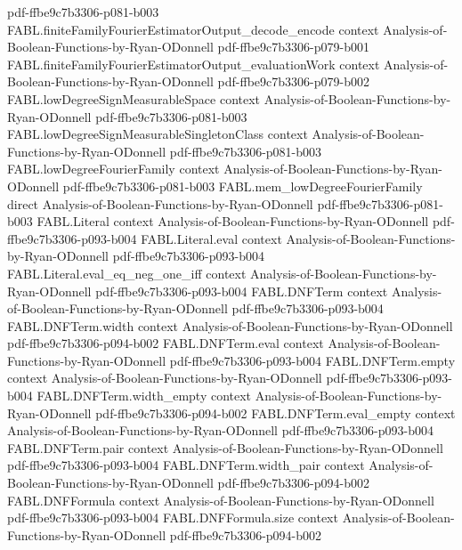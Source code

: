 \begin{theorem}
  {pdf-ffbe9c7b3306-p081-b003}
\proofstep
  {FABL.finiteFamilyFourierEstimatorOutput_decode_encode}
  {context}
  {Analysis-of-Boolean-Functions-by-Ryan-ODonnell}
  {pdf-ffbe9c7b3306-p079-b001}
\proofstep
  {FABL.finiteFamilyFourierEstimatorOutput_evaluationWork}
  {context}
  {Analysis-of-Boolean-Functions-by-Ryan-ODonnell}
  {pdf-ffbe9c7b3306-p079-b002}
\proofstep
  {FABL.lowDegreeSignMeasurableSpace}
  {context}
  {Analysis-of-Boolean-Functions-by-Ryan-ODonnell}
  {pdf-ffbe9c7b3306-p081-b003}
\proofstep
  {FABL.lowDegreeSignMeasurableSingletonClass}
  {context}
  {Analysis-of-Boolean-Functions-by-Ryan-ODonnell}
  {pdf-ffbe9c7b3306-p081-b003}
\proofstep
  {FABL.lowDegreeFourierFamily}
  {context}
  {Analysis-of-Boolean-Functions-by-Ryan-ODonnell}
  {pdf-ffbe9c7b3306-p081-b003}
\proofstep
  {FABL.mem_lowDegreeFourierFamily}
  {direct}
  {Analysis-of-Boolean-Functions-by-Ryan-ODonnell}
  {pdf-ffbe9c7b3306-p081-b003}
\proofstep
  {FABL.Literal}
  {context}
  {Analysis-of-Boolean-Functions-by-Ryan-ODonnell}
  {pdf-ffbe9c7b3306-p093-b004}
\proofstep
  {FABL.Literal.eval}
  {context}
  {Analysis-of-Boolean-Functions-by-Ryan-ODonnell}
  {pdf-ffbe9c7b3306-p093-b004}
\proofstep
  {FABL.Literal.eval_eq_neg_one_iff}
  {context}
  {Analysis-of-Boolean-Functions-by-Ryan-ODonnell}
  {pdf-ffbe9c7b3306-p093-b004}
\proofstep
  {FABL.DNFTerm}
  {context}
  {Analysis-of-Boolean-Functions-by-Ryan-ODonnell}
  {pdf-ffbe9c7b3306-p093-b004}
\proofstep
  {FABL.DNFTerm.width}
  {context}
  {Analysis-of-Boolean-Functions-by-Ryan-ODonnell}
  {pdf-ffbe9c7b3306-p094-b002}
\proofstep
  {FABL.DNFTerm.eval}
  {context}
  {Analysis-of-Boolean-Functions-by-Ryan-ODonnell}
  {pdf-ffbe9c7b3306-p093-b004}
\proofstep
  {FABL.DNFTerm.empty}
  {context}
  {Analysis-of-Boolean-Functions-by-Ryan-ODonnell}
  {pdf-ffbe9c7b3306-p093-b004}
\proofstep
  {FABL.DNFTerm.width_empty}
  {context}
  {Analysis-of-Boolean-Functions-by-Ryan-ODonnell}
  {pdf-ffbe9c7b3306-p094-b002}
\proofstep
  {FABL.DNFTerm.eval_empty}
  {context}
  {Analysis-of-Boolean-Functions-by-Ryan-ODonnell}
  {pdf-ffbe9c7b3306-p093-b004}
\proofstep
  {FABL.DNFTerm.pair}
  {context}
  {Analysis-of-Boolean-Functions-by-Ryan-ODonnell}
  {pdf-ffbe9c7b3306-p093-b004}
\proofstep
  {FABL.DNFTerm.width_pair}
  {context}
  {Analysis-of-Boolean-Functions-by-Ryan-ODonnell}
  {pdf-ffbe9c7b3306-p094-b002}
\proofstep
  {FABL.DNFFormula}
  {context}
  {Analysis-of-Boolean-Functions-by-Ryan-ODonnell}
  {pdf-ffbe9c7b3306-p093-b004}
\proofstep
  {FABL.DNFFormula.size}
  {context}
  {Analysis-of-Boolean-Functions-by-Ryan-ODonnell}
  {pdf-ffbe9c7b3306-p094-b002}

\end{theorem}
